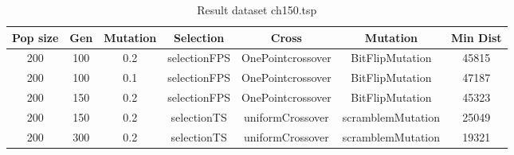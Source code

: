 \documentclass[12pt]{report}
\begin{document}
    \begin{table}
        \centering
        \begin{tabular}{|c|c|c|c|c|c|c|}
            \hline
            Pop size & Gen & Mutation & Selection & Cross & Mutation & Min Dist\\
            \hline
            200 & 100 & 0.2 & selectionFPS & OnePointcrossover & BitFlipMutation & 45815 \\
            \hline
            200 & 100 & 0.1 & selectionFPS & OnePointcrossover & BitFlipMutation & 47187 \\
            \hline
            200 & 150 & 0.2 & selectionFPS & OnePointcrossover & BitFlipMutation & 45323 \\
            \hline
            200 & 150 & 0.2 & selectionTS & uniformCrossover & scramblemMutation & 25049 \\
            \hline
            200 & 300 & 0.2 & selectionTS & uniformCrossover & scramblemMutation & 19321\\
            \hline
            \end{tabular}
        \caption{Result dataset ch150.tsp}
        \label{resultsch150}
    \end{table}
\end{document}

